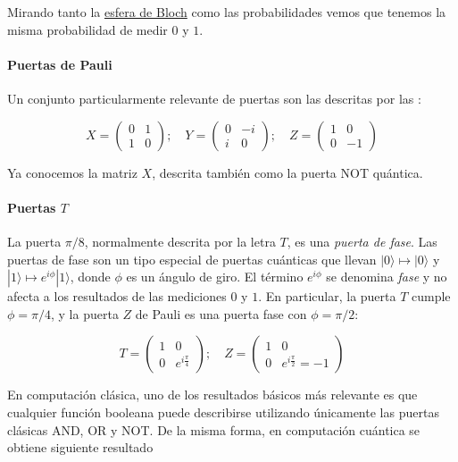 \documentclass[11pt]{article}
\newcommand{\ra}{\rangle}
\begin{document}
Mirando tanto la \href{URL}{esfera de Bloch} como las probabilidades vemos que tenemos la misma probabilidad de medir $0$ y $1$.

\paragraph*{Puertas de Pauli}

Un conjunto particularmente relevante de puertas son las descritas por las :

\[
X =
	\begin{pmatrix}
		0 & 1 \\
		1 & 0 
	\end{pmatrix}; \quad
	Y =
	\begin{pmatrix}
		0 & -i \\
		i & 0 
	\end{pmatrix}; \quad
	Z =
	\begin{pmatrix}
		1 & 0 \\
		0 & -1 
	\end{pmatrix}
\]

Ya conocemos la matriz $X$, descrita también como la puerta NOT quántica.

\paragraph*{Puertas $T$}

La puerta $\pi/8$, normalmente descrita por la letra $T$, es una \emph{puerta de fase}. Las puertas de fase son un tipo especial de puertas cuánticas que llevan $|0\ra \mapsto |0\ra$ y $|1\ra \mapsto e^{i\phi}|1\ra$, donde $\phi$ es un ángulo de giro. El término $e^{i\phi}$ se denomina \emph{fase} y no afecta a los resultados de las mediciones $0$ y $1$. En particular, la puerta $T$ cumple $\phi = \pi/4$, y la puerta $Z$ de Pauli es una puerta fase con $\phi = \pi/2$:

\[
	T =
	\begin{pmatrix}
		1 & 0 \\
		0 & e^{i\frac{\pi}{4}}
	\end{pmatrix}; \quad
	Z =
	\begin{pmatrix}
		1 & 0 \\
		0 & e^{i\frac{\pi}{2}} = -1
	\end{pmatrix}
\]

En computación clásica, uno de los resultados básicos más relevante es que cualquier función booleana puede describirse utilizando únicamente las puertas clásicas AND, OR y NOT. De la misma forma, en computación cuántica se obtiene siguiente resultado
\end{document}

